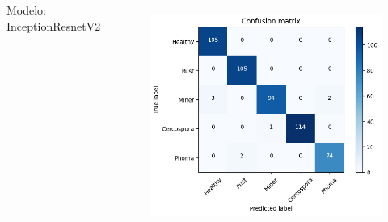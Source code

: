 \documentclass[aspectratio=169]{beamer}
\begin{document}
\begin{frame}
\begin{columns}
        \centering
        \tiny Modelo: InceptionResnetV2
        \begin{figure}
            \centering
            \includegraphics[scale=0.39]{img/Inceptionresult1.png}
            \label{fig:enter-label}
        \end{figure}



    \end{columns}
\end{frame}

\end{document}
